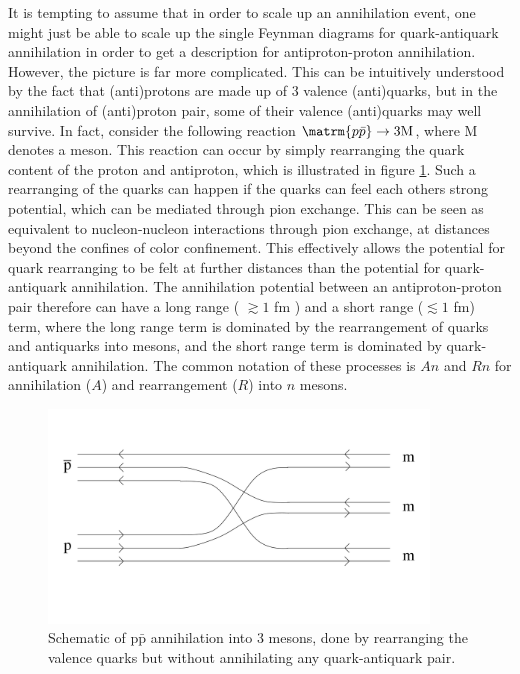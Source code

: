 It is tempting to assume that in order to scale up an annihilation event, one might just be able to scale up the single Feynman diagrams for quark-antiquark annihilation in order to get a description for antiproton-proton annihilation. However, the picture is far more complicated. This can be intuitively understood by the fact that (anti)protons are made up of 3 valence (anti)quarks, but in the annihilation of (anti)proton pair, some of their valence (anti)quarks may well survive. In fact, consider the following reaction $\matrm{p\bar{p}} \rightarrow 3 \mathrm{M}$, where M denotes a meson. This reaction can occur by simply rearranging the quark content of the proton and antiproton, which is illustrated in figure \ref{fig:Quark_Rearrangement}. Such a rearranging of the quarks can happen if the quarks can feel each others strong potential, which can be mediated through pion exchange. This can be seen as equivalent to nucleon-nucleon interactions through pion exchange, at distances beyond the confines of color confinement. This effectively allows the potential for quark rearranging to be felt at further distances than the potential for quark-antiquark annihilation. The annihilation potential between an antiproton-proton pair therefore can have a long range ( $\gtrsim 1$ fm ) and a short range ($\lesssim 1$ fm) term, where the long range term is dominated by the rearrangement of quarks and antiquarks into mesons, and the short range term is dominated by quark-antiquark annihilation. The common notation of these processes is $An$ and $Rn$ for annihilation ($A$) and rearrangement ($R$) into $n$ mesons.\\

\begin{figure}[h!]
    \centering
    \includegraphics[width=0.9\textwidth]{figures/quark_rearrangment.pdf}
    \caption{Schematic of $\mathrm{p\bar{p}}$ annihilation into 3 mesons, done by rearranging the valence quarks but without annihilating any quark-antiquark pair.}
    \label{fig:Quark_Rearrangement}
\end{figure}

